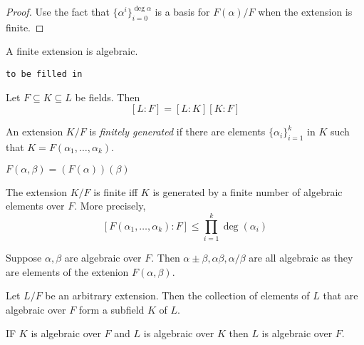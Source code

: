 \documentclass[a4paper]{article}
\begin{document}
\begin{proof}
  Use the fact that $\{\alpha^i\}_{i=0}^{\deg \alpha}$ is a basis for $F(\alpha)/F$ when the extension is finite.
\end{proof}

\begin{corollary}
  A finite extension is algebraic.
\end{corollary}

\begin{eg}

  \texttt{to be filled in}
\end{eg}

\begin{theorem}
  Let $F\subseteq K\subseteq L$ be fields. Then
  \[
    [L:F] = [L:K][K:F]
  \]
\end{theorem}

\begin{definition}
  An extension $K/F$ is \emph{finitely generated} if there are elements $\{\alpha_i\}_{i=1}^k$ in $K$ such that $K=F(\alpha_1,\ldots,\alpha_k)$.
\end{definition}

\begin{lemma}
  $F(\alpha,\beta) = (F(\alpha))(\beta)$
\end{lemma}

\begin{theorem}
  The extension $K/F$ is finite iff $K$ is generated by a finite number of algebraic elements over $F$. More precisely,
  \[
    [F(\alpha_1,\ldots,\alpha_k):F] \leq \prod_{i=1}^{k} \deg(\alpha_i)
  \]
\end{theorem}

\begin{corollary}
  Suppose $\alpha,\beta$ are algebraic over $F$. Then $\alpha\pm\beta,\alpha\beta,\alpha/\beta$ are all algebraic as they are elements of the extenion $F(\alpha,\beta)$.
\end{corollary}

\begin{corollary}
  Let $L/F$ be an arbitrary extension. Then the collection of elements of $L$ that are algebraic over $F$ form a subfield $K$ of $L$.
\end{corollary}

\begin{theorem}
  IF $K$ is algebraic over $F$ and $L$ is algebraic over $K$ then $L$ is algebraic over $F$.
\end{theorem}
\end{document}
